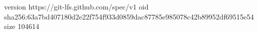 version https://git-lfs.github.com/spec/v1
oid sha256:63a7bd407180d2e22f754f933d0859dac87785e985078c42b89952df69515e54
size 104614
